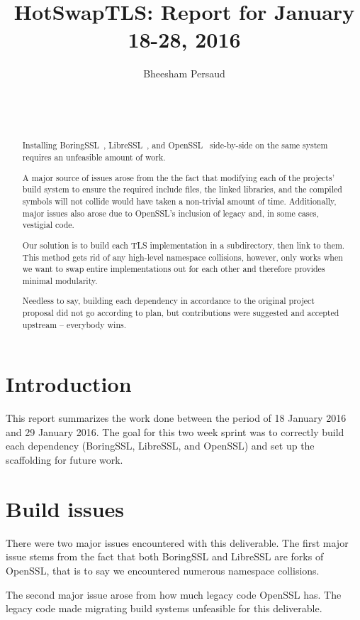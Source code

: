 \documentclass{acm_proc_article-sp}
\title{HotSwapTLS: Report for January 18-28, 2016}
\author{
    \alignauthor
    Bheesham Persaud\\
        \affaddr{Carleton University}\\
        \affaddr{1125 Colonel By Drive}\\
        \affaddr{Ottawa, Ontario}\\
        \email{bheeshampersaud@cmail.carleton.ca}
}
\begin{document}
\maketitle

\begin{abstract}\label{sec:abstract}
  Installing BoringSSL~\cite{boringssl}, LibreSSL~\cite{libressl}, and
  OpenSSL~\cite{openssl} side-by-side on the same system requires an unfeasible
  amount of work.

  A major source of issues arose from the the fact that modifying each of the
  projects' build system to ensure the required include files, the linked
  libraries, and the compiled symbols will not collide would have taken a
  non-trivial amount of time. Additionally, major issues also arose due to
  OpenSSL's inclusion of legacy and, in some cases, vestigial code.

  Our solution is to build each TLS implementation in a subdirectory, then link
  to them. This method gets rid of any high-level namespace collisions, however,
  only works when we want to swap entire implementations out for each other and
  therefore provides minimal modularity.

  Needless to say, building each dependency in accordance to the original
  project proposal did not go according to plan, but contributions were
  suggested and accepted upstream -- everybody wins.
\end{abstract}

\section{Introduction}

This report summarizes the work done between the period of 18 January 2016 and
29 January 2016. The goal for this two week sprint was to correctly build each
dependency (BoringSSL, LibreSSL, and OpenSSL) and set up the scaffolding for
future work.

\section{Build issues}

There were two major issues encountered with this deliverable. The first major
issue stems from the fact that both BoringSSL and LibreSSL are forks of OpenSSL,
that is to say we encountered numerous namespace collisions.

The second major issue arose from how much legacy code OpenSSL has. The legacy
code made migrating build systems unfeasible for this deliverable.
\end{document}
